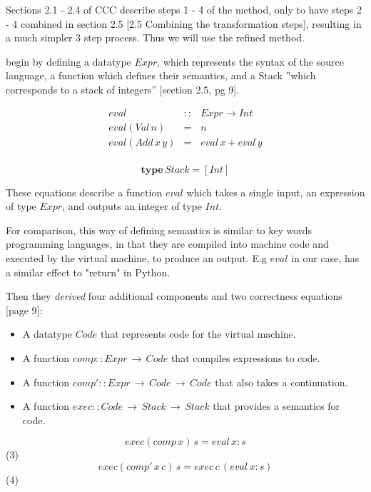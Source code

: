 \documentclass {article}
\begin{document}
Sections 2.1 - 2.4 of CCC describe steps
1 - 4 of the method, only to have steps 2 - 4 combined
in section 2.5 \cite{bandh}[2.5 Combining the transformation steps],
 resulting in a much simpler 3 step process.
 Thus we will use the refined method.

\BH begin by defining a datatype $Expr$, which represents
the syntax of the source language,
 a function which defines their semantics,
and a Stack ''which corresponds to a stack of integers''
\cite{bandh}[section 2.5, pg 9].

\newcommand{\eval}{\emph{eval}}

\begin{eqnarray*}
	 eval &::& Expr \rightarrow Int \\ 
	 eval (Val \, n) &=& n \\
	 eval (Add \, x \, y) &=& eval \, x + eval \, y \\
\end{eqnarray*}

	\[ \textbf{type} \, Stack = [Int]\]

These equations describe a function $eval$ 
which takes a single input,
 an expression of type $Expr$, 
 and outputs an integer of type
$Int$.

For comparison, this way of defining semantics
is similar to key words programming
languages, in that they are compiled into 
machine code and executed
by the virtual machine, 
 to produce an output.
E.g $eval$ in our case, has a similar effect to 
"return" in Python.

Then they \emph{derived} four additional 
components and two correctness equations
\cite{bandh}[page 9]:

\begin{itemize}
	\item A datatype $Code$ that represents
		code for the virtual machine.
	\item A function \( comp::Expr \, \rightarrow \, Code \)
		that compiles expressions to code.
	\item A function 
		\( comp'::Expr \, \rightarrow \, Code \, \rightarrow \, Code \)
		that also takes a continuation.
	\item A function
		\( exec::Code \, \rightarrow \, Stack \, \rightarrow \, Stack \)
		that provides a semantics for code.
\end{itemize}

	\[ exec(comp \, x) \, s = eval \, x:s \] (3)
	\[ exec(comp' \, x \, c) \, s = exec \, c \, (eval \, x:s) \] (4)
\end{document}
